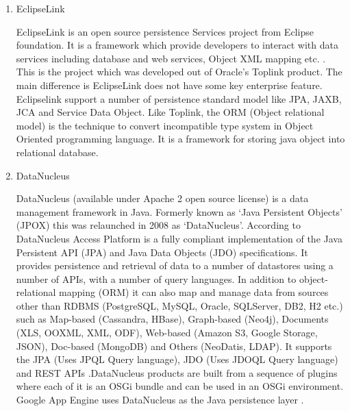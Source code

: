 \begin{enumerate}
\item {} 
EclipseLink

EclipseLink is an open source persistence Services project from Eclipse
foundation. It is a framework which provide developers to
interact with data services including database and web services,
Object XML mapping etc. \label{\detokenize{i524/technologies:id356}}{\hyperref[\detokenize{i524/technologies:www-eclipselink}]{\sphinxcrossref{{[}304{]}}}}. This is the project
which was developed out of Oracle's Toplink product. The main
difference is EclipseLink does not have some key enterprise
feature. Eclipselink support a number of persistence standard
model like JPA, JAXB, JCA and Service Data Object. Like Toplink,
the ORM (Object relational model) is the technique to convert
incompatible type system in Object Oriented programming
language. It is a framework for storing java object into
relational database.

\item {} 
DataNucleus

DataNucleus (available under Apache 2 open source license) is a
data management framework in Java. Formerly known as ‘Java
Persistent Objects’ (JPOX) this was relaunched in 2008 as
‘DataNucleus’. According to \label{\detokenize{i524/technologies:id357}}{\hyperref[\detokenize{i524/technologies:datanucleuswiki}]{\sphinxcrossref{{[}305{]}}}} DataNucleus
Access Platform is a fully compliant implementation of the Java
Persistent API (JPA) and Java Data Objects (JDO)
specifications. It provides persistence and retrieval of data to
a number of datastores using a number of APIs, with a number of
query languages. In addition to object-relational mapping (ORM)
it can also map and manage data from sources other than RDBMS
(PostgreSQL, MySQL, Oracle, SQLServer, DB2, H2 etc.) such as
Map-based (Cassandra, HBase), Graph-based (Neo4j), Documents
(XLS, OOXML, XML, ODF), Web-based (Amazon S3, Google Storage,
JSON), Doc-based (MongoDB) and Others (NeoDatis, LDAP). It
supports the JPA (Uses JPQL Query language), JDO (Uses JDOQL
Query language) and REST APIs \label{\detokenize{i524/technologies:id358}}{\hyperref[\detokenize{i524/technologies:datanucleus}]{\sphinxcrossref{{[}306{]}}}}.DataNucleus
products are built from a sequence of plugins where each of it is
an OSGi bundle and can be used in an OSGi environment. Google App
Engine uses DataNucleus as the Java persistence layer
\label{\detokenize{i524/technologies:id359}}{\hyperref[\detokenize{i524/technologies:datanucleusperformance}]{\sphinxcrossref{{[}307{]}}}}.


\end{enumerate}
